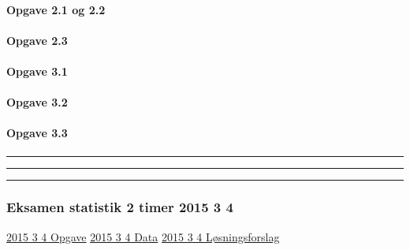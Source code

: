 \documentclass[]{book}
\let\oldparagraph\paragraph
\renewcommand{\paragraph}[1]{\oldparagraph{#1}\mbox{}}
\begin{document}
\hypertarget{opgave-2.1-og-2.2}{%
\paragraph{Opgave 2.1 og 2.2}\label{opgave-2.1-og-2.2}}

\hypertarget{opgave-2.3}{%
\paragraph{Opgave 2.3}\label{opgave-2.3}}

\hypertarget{opgave-3.1}{%
\paragraph{Opgave 3.1}\label{opgave-3.1}}

\hypertarget{opgave-3.2}{%
\paragraph{Opgave 3.2}\label{opgave-3.2}}

\hypertarget{opgave-3.3}{%
\paragraph{Opgave 3.3}\label{opgave-3.3}}

\begin{center}\rule{0.5\linewidth}{\linethickness}\end{center}

\begin{center}\rule{0.5\linewidth}{\linethickness}\end{center}

\begin{center}\rule{0.5\linewidth}{\linethickness}\end{center}

\hypertarget{eksamen-statistik-2-timer-2015-3-4}{%
\subsubsection{Eksamen statistik 2 timer 2015 3
4}\label{eksamen-statistik-2-timer-2015-3-4}}

\href{https://drive.google.com/file/d/0B1E7VnhxsDMlLVBMek5kWEhRZlU/view?usp=sharing}{2015
3 4 Opgave}
\href{https://drive.google.com/file/d/0B1E7VnhxsDMlX0p3Qk8wWlNxM28/view?usp=sharing}{2015
3 4 Data}
\href{https://drive.google.com/file/d/0B1E7VnhxsDMlWXNWTW55Sk94RDA/view?usp=sharing}{2015
3 4 Løsningsforslag}
\end{document}
